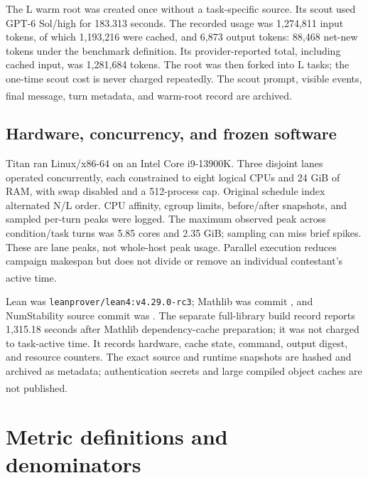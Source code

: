 \documentclass[10pt,a4paper]{article}
\newcommand{\src}[1]{\textsuperscript{\cite{#1}}}
\begin{document}
The L warm root was created once without a task-specific source. Its scout
used GPT-6 Sol/high for 183.313 seconds. The recorded usage was 1,274,811
input tokens, of which 1,193,216 were cached, and 6,873 output tokens:
88,468 net-new tokens under the benchmark definition. Its provider-reported
total, including cached input, was 1,281,684 tokens. The root was then
forked into L tasks; the one-time scout cost is never charged repeatedly.
The scout prompt, visible events, final message, turn metadata, and warm-root
record are archived.\src{warmroot,warmscout}

\subsection{Hardware, concurrency, and frozen software}

Titan ran Linux/x86-64 on an Intel Core i9-13900K. Three disjoint lanes
operated concurrently, each constrained to eight logical CPUs and 24 GiB
of RAM, with swap disabled and a 512-process cap. Original schedule index
alternated N/L order. CPU affinity, cgroup limits, before/after snapshots,
and sampled per-turn peaks were logged. The maximum observed peak across
condition/task turns was 5.85 cores and 2.35 GiB; sampling can miss brief
spikes. These are lane peaks, not whole-host peak usage. Parallel execution
reduces campaign makespan but does not divide or remove an individual
contestant's active time.\src{campaigns,evidencearchives,results35}

Lean was \texttt{leanprover/lean4:v4.29.0-rc3}; Mathlib was commit
\texttt{}, and
NumStability source commit was
\texttt{}.
The separate full-library build record reports 1,315.18 seconds after Mathlib
dependency-cache preparation; it was not charged to task-active time. It
records hardware, cache state, command, output digest, and resource counters.
The exact source and runtime snapshots are hashed and archived as metadata;
authentication secrets and large compiled object caches are not published.
\src{buildrecord,libsnapshot,runtimesnapshot,deployrecord}

\section{Metric definitions and denominators}
\end{document}
